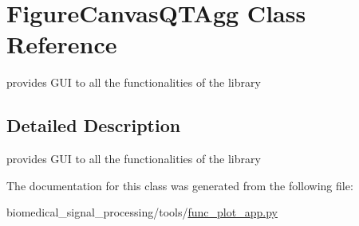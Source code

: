 \hypertarget{classFigureCanvasQTAgg}{}\section{Figure\+Canvas\+Q\+T\+Agg Class Reference}
\label{classFigureCanvasQTAgg}


provides G\+UI to all the functionalities of the library  




\subsection{Detailed Description}
provides G\+UI to all the functionalities of the library 

The documentation for this class was generated from the following file\+:\begin{DoxyCompactItemize}
\item 
biomedical\+\_\+signal\+\_\+processing/tools/\hyperlink{func__plot__app_8py}{func\+\_\+plot\+\_\+app.\+py}\end{DoxyCompactItemize}

